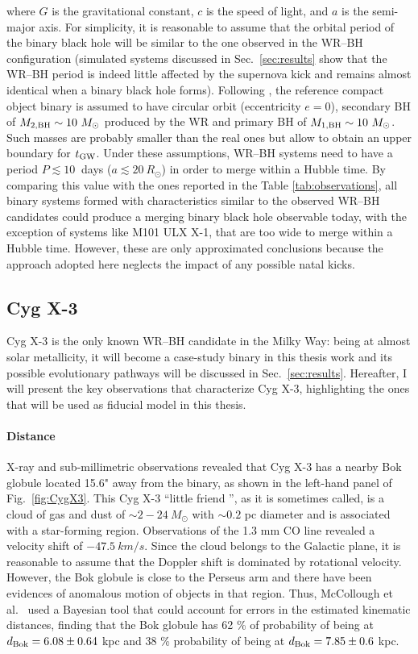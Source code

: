 \documentclass[a4paper,titlepage]{book}     	%
\newcommand{\sun}{\ensuremath{_\odot}}
\newcommand{\msun}{\ensuremath{M\sun}}
\newcommand{\rsun}{R_{\odot}}
\begin{document}
where $G$ is the gravitational constant, $c$ is the speed of light, and $a$ is the semi-major axis. For simplicity, it is reasonable to assume that the orbital period of the binary black hole will be similar to the one observed in the WR--BH configuration (simulated systems discussed in Sec.\ \ref{sec:results} show that the WR--BH period is indeed little affected by the supernova kick and remains almost identical when a binary black hole forms). Following \cite{observations}, the reference compact object binary is assumed to have circular orbit (eccentricity $e=0$), secondary BH of $M_{2,\rm BH} \sim 10~\msun$ produced by the WR and primary BH of $M_{1,\rm BH} \sim 10~\msun$. Such masses are probably smaller than the real ones but allow to obtain an upper boundary for $t_\textup{GW}$. Under these assumptions, WR--BH systems need to have a period $P \lesssim 10~$ days ($a \lesssim 20~\rsun$) in order to merge within a Hubble time. By comparing this value with the ones reported in the Table \ref{tab:observations}, all binary systems formed with characteristics similar to the observed WR--BH candidates could produce a merging binary black hole observable today, with the exception of systems like M101 ULX X-1, that are too wide to merge within a Hubble time. However, these are only approximated conclusions because the approach adopted here neglects the impact of any possible natal kicks.


\subsection{Cyg X-3}\label{subsec:cygx3observations}
Cyg X-3 is the only known WR--BH candidate in the Milky Way: being at almost solar metallicity, it will become a case-study binary in this thesis work and its possible evolutionary pathways will be discussed in Sec.\ \ref{sec:results}. Hereafter, I will present the key observations that characterize Cyg X-3, highlighting the ones that will be used as fiducial model in this thesis.

\paragraph{Distance}
X-ray and sub-millimetric observations revealed that Cyg X-3 has a nearby Bok globule located 15.6" away from the binary, as shown in the left-hand panel of Fig.\ \ref{fig:CygX3}. This Cyg X-3 ``little friend '', as it is sometimes called, is a cloud of gas and dust of $\sim 2-24~\msun$ with $\sim 0.2$ pc diameter and is associated with a star-forming region. Observations of the 1.3 mm CO line revealed a velocity shift of $\SI{-47.5}{km/s}$. Since the cloud belongs to the Galactic plane, it is reasonable to assume that the Doppler shift is dominated by rotational velocity. However, the Bok globule is close to the Perseus arm and there have been evidences of anomalous motion of objects in that region. Thus, McCollough et al.\ \cite{CygX-3_McCollough2016_Observation} used a Bayesian tool that could account for errors in the estimated kinematic distances, finding that the Bok globule has 62 \% of probability of being at $d_{\rm Bok} = 6.08 \pm 0.64$ kpc and 38 \% probability of being at $d_{\rm Bok} = 7.85 \pm 0.6$ kpc.
\end{document}
